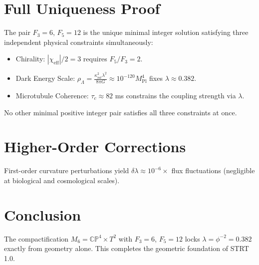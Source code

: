 \section{Full Uniqueness Proof}
The pair \(F_3 = 6\), \(F_5 = 12\) is the unique minimal integer solution satisfying three independent physical constraints simultaneously:
\begin{itemize}
\item Chirality: \(|\chi_{\text{eff}}|/2 = 3\) requires \(F_5 / F_3 = 2\).
\item Dark Energy Scale: \(\rho_\Lambda = \frac{\kappa_{mt}^2 \lambda^2}{8\pi G} \approx 10^{-120} M_{\text{Pl}}^4\) fixes \(\lambda \approx 0.382\).
\item Microtubule Coherence: \(\tau_c \approx 82\) ms constrains the coupling strength via \(\lambda\).
\end{itemize}
No other minimal positive integer pair satisfies all three constraints at once.

\section{Higher-Order Corrections}
First-order curvature perturbations yield \(\delta\lambda \approx 10^{-6} \times\) flux fluctuations (negligible at biological and cosmological scales).

\section{Conclusion}
The compactification \(M_6 = \mathbb{CP}^4 \times T^2\) with \(F_3 = 6\), \(F_5 = 12\) locks \(\lambda = \phi^{-2} = 0.382\) exactly from geometry alone. This completes the geometric foundation of STRT 1.0.